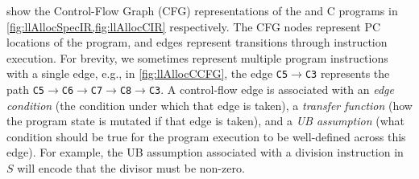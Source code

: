  show the Control-Flow Graph (CFG) representations
of the \SpecL{} and C programs in \cref{fig:llAllocSpecIR,fig:llAllocCIR} respectively.
The CFG nodes represent PC locations of the program, and edges represent
transitions through instruction execution. For brevity, we sometimes represent
multiple program instructions with a single edge, e.g., in \cref{fig:llAllocCCFG}, the edge {\small \tt C5$\rightarrow$C3}
represents the path {\small \tt C5$\rightarrow$C6$\rightarrow$C7$\rightarrow$C8$\rightarrow$C3}. A control-flow edge is associated
with an {\em edge condition} (the condition under which that edge is taken),
a {\em transfer function} (how the program state is mutated if that edge is taken),
and a {\em UB assumption} (what condition should be true for the program
execution to be
well-defined across this edge). For example, the UB assumption associated with a division
instruction in $S$ will encode that the divisor must be non-zero.